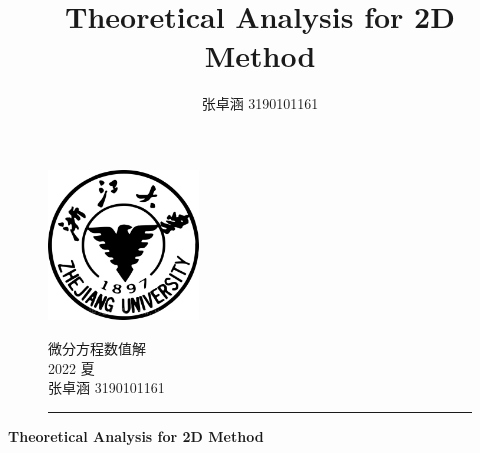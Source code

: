 \documentclass[a4paper,11.5pt,UTF8]{ctexart}
\title{Theoretical Analysis for 2D Method}
\author{张卓涵 3190101161}
\begin{document}
\begin{figure}[t]
\begin{minipage}[h]{0.25\linewidth}
	\includegraphics[width=4.0cm]{./figure/ZJU2.jpeg}
\end{minipage}
\hfill
\begin{minipage}[h]{.7\linewidth}
	\begin{flushright}
			\Large{微分方程数值解
				\vspace{3mm}	\\
				   2022 夏
				\vspace{3mm}	\\
				   张卓涵 \hspace{3mm}3190101161}
	\end{flushright}
\end{minipage}
\rule{\linewidth}{0.1em}
\end{figure}
\begin{center}
	\huge{\textbf{Theoretical Analysis for 2D Method}}
\end{center}
\end{document}
